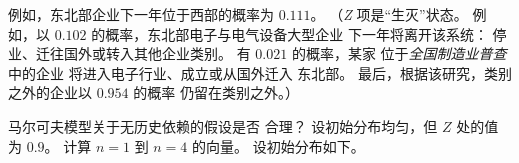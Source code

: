 \begin{exercises}
{\begin{center}
\begin{tabular}{c|ccccc}
      \end{tabular}
    \end{center}}
    例如，东北部企业下一年位于西部的概率为 $0.111$。
    （\textit{Z} 项是“生灭”状态。
     例如，以 $0.102$ 的概率，东北部电子与电气设备大型企业
     下一年将离开该系统：
     停业、迁往国外或转入其他企业类别。
     有 $0.021$ 的概率，某家
     位于\emph{全国制造业普查}中的企业
     将进入电子行业、成立或从国外迁入
     东北部。
     最后，根据该研究，类别之外的企业以 $0.954$ 的概率
     仍留在类别之外。）
    \begin{exparts}
      \partsitem 马尔可夫模型关于无历史依赖的假设是否
        合理？
      \partsitem 设初始分布均匀，但
        $Z$ 处的值为 $0.9$。
        计算 $n=1$ 到 $n=4$ 的向量。
      \partsitem 设初始分布如下。

\end{exparts}
\end{exercises}
